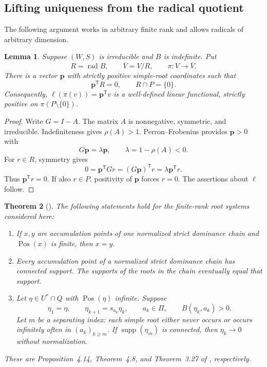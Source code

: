 \documentclass[11pt,reqno]{amsart}
\theoremstyle{plain}
\newtheorem{theorem}{Theorem}[section]
\newtheorem{lemma}[theorem]{Lemma}
\theoremstyle{definition}
\theoremstyle{remark}
\numberwithin{equation}{section}
\DeclareMathOperator{\supp}{supp}
\DeclareMathOperator{\Pos}{Pos}
\DeclareMathOperator{\rad}{rad}
\begin{document}
\subsection{Lifting uniqueness from the radical quotient}

The following argument works in arbitrary finite rank and allows radicals of arbitrary dimension.

\begin{lemma}\label{lem:radical-positive}
Suppose $(W,S)$ is irreducible and $B$ is indefinite. Put
\[
R=\rad B,\qquad\overline V=V/R,\qquad\pi:V\longrightarrow\overline V.
\]
There is a vector $\mathbf p$ with strictly positive simple-root coordinates such that
\[
\mathbf p^{\mathsf T}R=0,\qquad R\cap P=\{0\}.
\]
Consequently, $\ell(\pi(v))=\mathbf p^{\mathsf T}v$ is a well-defined linear functional, strictly positive on $\pi(P\setminus\{0\})$.
\end{lemma}
\begin{proof}
Write $G=I-A$. The matrix $A$ is nonnegative, symmetric, and irreducible. Indefiniteness gives $\rho(A)>1$. Perron--Frobenius provides $\mathbf p>0$ with
\[
G\mathbf p=\lambda\mathbf p,\qquad\lambda=1-\rho(A)<0.
\]
For $r\in R$, symmetry gives
\[
0=\mathbf p^{\mathsf T}Gr=(G\mathbf p)^{\mathsf T}r
=\lambda\mathbf p^{\mathsf T}r.
\]
Thus $\mathbf p^{\mathsf T}r=0$. If also $r\in P$, positivity of $\mathbf p$ forces $r=0$. The assertions about $\ell$ follow.
\end{proof}

\begin{theorem}[\cite{FuEtAl2026}]\label{thm:descent-inputs}
The following statements hold for the finite-rank root systems considered here:
\begin{enumerate}[label=(\alph*)]
\item If $x,y$ are accumulation points of one normalized strict dominance chain and $\Pos(x)$ is finite, then $x=y$.
\item Every accumulation point of a normalized strict dominance chain has connected support. The supports of the roots in the chain eventually equal that support.
\item Let $\eta\in U^*\cap Q$ with $\Pos(\eta)$ infinite. Suppose
\[
\eta_1=\eta,\qquad\eta_{k+1}=s_{a_k}\eta_k,\qquad
 a_k\in\Pi,\qquad B(\eta_k,a_k)>0.
\]
Let $m$ be a separating index: each simple root either never occurs or occurs infinitely often in $(a_k)_{k\geq m}$. If $\supp(\eta_m)$ is connected, then $\eta_k\to0$ without normalization.
\end{enumerate}
These are Proposition~4.14, Theorem~4.8, and Theorem~3.27 of \cite{FuEtAl2026}, respectively.
\end{theorem}
\end{document}

